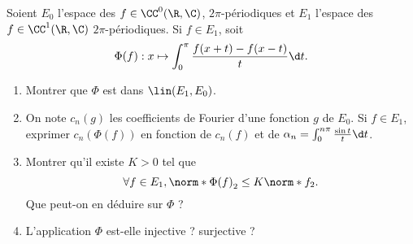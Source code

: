 \begin{enonce}
\begin{exercise}[ID={RMS 121-2 E1004},subtitle={},tags={}]
  Soient $E_0$ l'espace des $f\in\CC^0(\R,\C)$, $2\pi$-périodiques et $E_1$ l'espace des $f\in\CC^1(\R,\C)$ $2\pi$-périodiques.
  Si $f\in E_1$, soit
  \begin{equation*}
    \Phi(f):x\mapsto \int_0^\pi\frac{f(x+t)-f(x-t)}{t}\d t.
  \end{equation*}
  \begin{enumerate}
    \item Montrer que $\Phi$ est dans $\lin(E_1,E_0)$.
    \item On note $c_n(g)$ les coefficients de Fourier d'une fonction $g$ de $E_0$.
      Si $f\in E_1$, exprimer $c_n\left( \Phi(f) \right)$ en fonction de $c_n(f)$ et de $\alpha_n=\int_0^{n\pi}\frac{\sin t}{t} \d t$.
    \item Montrer qu'il existe $K>0$ tel que
      \begin{equation*}
        \forall f\in E_1, \norm*{\Phi(f)}_2 \leq K\norm*{f}_2.
      \end{equation*}
      Que peut-on en déduire sur $\Phi$ ?
    \item L'application $\Phi$ est-elle injective ? surjective ?
  \end{enumerate}
\end{exercise}
\begin{solution}
\end{solution}
\end{enonce}
